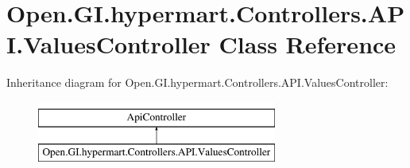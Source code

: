 \section{Open.\+G\+I.\+hypermart.\+Controllers.\+A\+P\+I.\+Values\+Controller Class Reference}
\label{class_open_1_1_g_i_1_1hypermart_1_1_controllers_1_1_a_p_i_1_1_values_controller}


 


Inheritance diagram for Open.\+G\+I.\+hypermart.\+Controllers.\+A\+P\+I.\+Values\+Controller\+:\begin{figure}[H]
\begin{center}
\leavevmode
\includegraphics[height=2.000000cm]{class_open_1_1_g_i_1_1hypermart_1_1_controllers_1_1_a_p_i_1_1_values_controller}
\end{center}
\end{figure}
